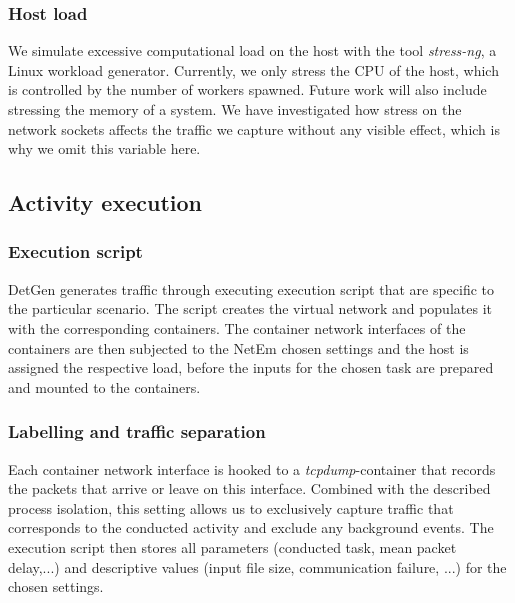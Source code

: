\documentclass[runningheads]{llncs}
\begin{document}
\subsubsection{Host load}

We simulate excessive computational load on the host with the tool \emph{stress-ng}, a Linux workload generator. Currently, we only stress the CPU of the host, which is controlled by the number of workers spawned. Future work will also include stressing the memory of a system. We have investigated how stress on the network sockets affects the traffic we capture without any visible effect, which is why we omit this variable here. 

\subsection{Activity execution}

\subsubsection*{Execution script}

DetGen generates traffic through executing execution script that are specific to the particular scenario. The script creates the virtual network and populates it with the corresponding containers. The container network interfaces of the containers are then subjected to the NetEm chosen settings and the host is assigned the respective load, before the inputs for the chosen task are prepared and mounted to the containers. 


\subsubsection*{Labelling and traffic separation}

Each container network interface is hooked to a \emph{tcpdump}-container that records the packets that arrive or leave on this interface. Combined with the described process isolation, this setting allows us to exclusively capture traffic that corresponds to the conducted activity and exclude any background events. The execution script then stores all parameters (conducted task, mean packet delay,...) and descriptive values (input file size, communication failure, ...) for the chosen settings.
\end{document}
